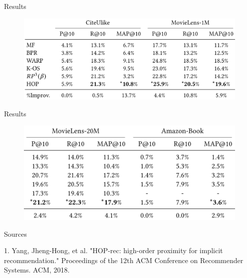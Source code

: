 \documentclass{beamer}
\begin{document}
\begin{frame}{Results}
\begin{figure}[h]
\includegraphics[width=\textwidth]{img/results1}
\end{figure}
\end{frame}
\begin{frame}{Results}
\begin{figure}[h]
\includegraphics[width=\textwidth]{img/results2}
\end{figure}
\end{frame}

\begin{frame}{Sources}

\begin{thebibliography}{0}

   1. Yang, Jheng-Hong, et al. "HOP-rec: high-order proximity for implicit recommendation." Proceedings of the 12th ACM Conference on Recommender Systems. ACM, 2018.
  
\end{thebibliography}

\end{frame}

 
 
 
\end{document}
